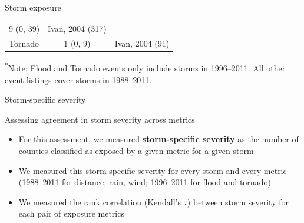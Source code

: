 \documentclass[ignorenonframetext,]{beamer}
\begin{document}
\begin{frame}{Storm exposure}
\begin{longtable}[]{@{}lcc@{}}
\begin{minipage}[t]{0.34\columnwidth}
9 (0, 39)\strut
\end{minipage} & \begin{minipage}[t]{0.34\columnwidth}\centering\strut
Ivan, 2004 (317)\strut
\end{minipage}\tabularnewline
\begin{minipage}[t]{0.23\columnwidth}\raggedright\strut
Tornado\strut
\end{minipage} & \begin{minipage}[t]{0.34\columnwidth}\centering\strut
1 (0, 9)\strut
\end{minipage} & \begin{minipage}[t]{0.34\columnwidth}\centering\strut
Ivan, 2004 (91)\strut
\end{minipage}\tabularnewline
\bottomrule
\end{longtable}

\footnotesize{\textsuperscript{*}Note: Flood and Tornado events only include storms in 1996--2011. All other event listings cover storms in 1988--2011.}

\end{frame}

\begin{frame}{Storm-specific severity}

\begin{block}{Assessing agreement in storm severity across metrics}
\begin{itemize}
\item For this assessment, we measured \textbf{storm-specific severity} as the number of counties classified as exposed by a given metric for a given storm
\item We measured this storm-specific severity for every storm and every metric (1988--2011 for distance, rain, wind; 1996--2011 for flood and tornado)
\item We measured the rank correlation (Kendall's $\tau$) between storm severity for each pair of exposure metrics 
\end{itemize}
\end{block}

\end{frame}
\end{document}
